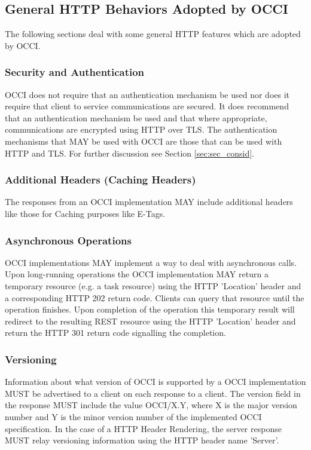 \documentclass[10pt,a4paper]{article}
\begin{document}
\subsection{General HTTP Behaviors Adopted by OCCI}
The following sections deal with some general HTTP features which are
adopted by OCCI.

\subsubsection{Security and Authentication}
OCCI does not require that an authentication mechanism be used nor
does it require that client to service communications are secured. It
does recommend that an authentication mechanism be used and that where
appropriate, communications are encrypted using HTTP over TLS. The
authentication mechanisms that MAY be used with OCCI are those that
can be used with HTTP and TLS. For further discussion see Section 
\ref{sec:sec_consid}.

\subsubsection{Additional Headers (Caching Headers)}
The responses from an OCCI implementation MAY include additional
headers like those for Caching purposes like E-Tags.

\subsubsection{Asynchronous Operations}
OCCI implementations MAY implement a way to deal with asynchronous
calls. Upon long-running operations the OCCI implementation MAY return
a temporary resource (e.g. a task resource) using the HTTP 'Location'
header and a corresponding HTTP 202 return code. Clients can query
that resource until the operation finishes. Upon completion of the
operation this temporary result will redirect to the resulting REST
resource using the HTTP 'Location' header and return the HTTP 301
return code signalling the completion.

\subsubsection{Versioning}
Information about what version of OCCI is supported by a OCCI
implementation MUST be advertised to a client on each response to a
client. The version field in the response MUST include the value
OCCI/X.Y, where X is the major version number and Y is the minor
version number of the implemented OCCI specification. In the case of a
HTTP Header Rendering, the server response MUST relay versioning
information using the HTTP header name 'Server'.
\end{document}
